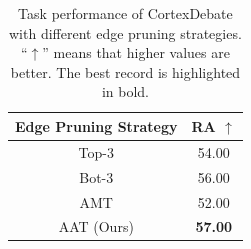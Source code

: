 \begin{table}
  \centering
  \setlength{\tabcolsep}{5mm}
\begin{tabular}{cc}
\toprule
\multicolumn{1}{c}{Edge Pruning Strategy}     & RA $\uparrow$ \\ \midrule
Top-3     & 54.00         \\
Bot-3                & 56.00         \\
AMT       & 52.00         \\
AAT (Ours) & \textbf{57.00}     \\  \bottomrule
\end{tabular}
  \caption{\label{average_based}
   Task performance of CortexDebate with different edge pruning strategies. ``$\uparrow$'' means that higher values are better. The best record is highlighted in bold.
  }
\end{table}